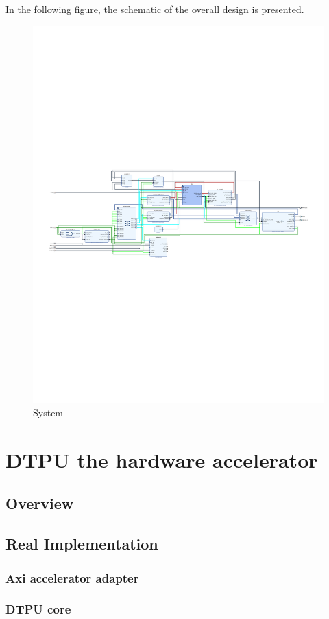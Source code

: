 \newpage
In the following figure, the schematic of the overall design is presented.
\begin{figure}[!htbp] 
\centering
\captionsetup{justification=centering}
  \includegraphics[scale=0.97,angle=90]{./figure/system_schematic.pdf}
\caption{System}
  \label{fig:sys}
\end{figure} 


\section{DTPU the hardware accelerator}



\subsection{Overview}

\subsection{Real Implementation}
 \subsubsection{Axi accelerator adapter}
 \subsubsection{DTPU core} 

